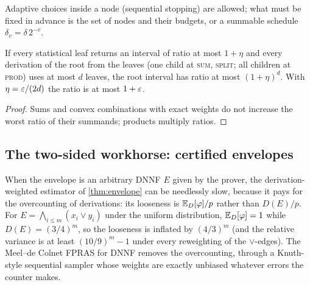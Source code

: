 Adaptive choices inside a node (sequential stopping) are allowed; what must
be fixed in advance is the set of nodes and their budgets, or a summable
schedule $\delta_v=\delta\,2^{-v}$.

\begin{proposition}\label{prop:calculus}
If every statistical leaf returns an interval of ratio at most $1+\eta$ and
every derivation of the root from the leaves (one child at \textsc{sum},
\textsc{split}; all children at \textsc{prod}) uses at most $d$ leaves, the
root interval has ratio at most $(1+\eta)^d$. With $\eta=\varepsilon/(2d)$ the
ratio is at most $1+\varepsilon$.
\end{proposition}

\begin{proof}
Sums and convex combinations with exact weights do not increase the worst
ratio of their summands; products multiply ratios.
\end{proof}

\subsection{The two-sided workhorse: certified envelopes}

When the envelope is an arbitrary DNNF $E$ given by the prover, the
derivation-weighted estimator of \cref{thm:envelope} can be needlessly slow,
because it pays for the overcounting of derivations: its looseness is
$\mathbb{E}_D[\varphi]/p$ rather than $D(E)/p$. For $E=\bigwedge_{i\le m}(x_i\vee y_i)$
under the uniform distribution, $\mathbb{E}_D[\varphi]=1$ while $D(E)=(3/4)^m$, so the
looseness is inflated by $(4/3)^m$ (and the relative variance is at least
$(10/9)^m-1$ under every reweighting of the $\vee$-edges). The
Meel--de Colnet FPRAS for DNNF \cite{meel2026dnnf} removes the overcounting,
through a Knuth-style sequential sampler whose weights are exactly unbiased
whatever errors the counter makes.

